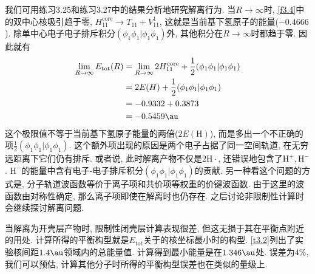我们可用练习3.25和练习3.27中的结果分析地研究解离行为. 
当$R\to\infty$时, 
\autoref{f3.4}中的双中心核吸引趋于零, 
$H_{11}^\mathrm{core}\to T_{11}+V_{11}^1$, 
这就是当前基下氢原子的能量($-0.4666$). 
除单中心电子电子排斥积分$(\phi_1\phi_1|\phi_1\phi_1)$外, 
其他积分在$R\to \infty$时都趋于零. 
因此就有
\begin{align*}
	\lim_{R\to\infty} E_\mathrm{tot}(R) & = \lim_{R\to\infty} 2H_{11}^\mathrm{core} + \frac{1}{2}(\phi_1\phi_1|\phi_1\phi_1) \\
	& = 2E(H) + \frac{1}{2}(\phi_1\phi_1|\phi_1\phi_1)                                   \\
	& = -0.9332 + 0.3873                                                                 \\
	& = -0.5459\au
\end{align*}
这个极限值不等于当前基下氢原子能量的两倍($2E(\mathrm{H})$), 
而是多出一个不正确的项$\frac{1}{2}(\phi_1\phi_1|\phi_1\phi_1)$. 
这个额外项出现的原因是两个电子占据了同一空间轨道, 
在无穷远距离下它们仍有排斥. 
或者说, 此时解离产物不仅是$2\mathrm{H}\cdot$, 
还错误地包含了$\mathrm{H}^+,\mathrm{H}^-$. 
$\mathrm{H}^-$的能量中含有电子-电子排斥积分$(\phi_1\phi_1|\phi_1\phi_1)$的贡献. 
另一种看这个问题的方式是, 
分子轨道波函数等价于离子项和共价项等权重的价键波函数. 
由于这里的波函数由对称性确定, 
那么离子项即使在解离时也仍存在. 
之后讨论非限制性\hft 计算时会继续探讨解离问题.


当解离为开壳层产物时, 
限制性闭壳层\hft 计算表现很差, 
但这无损于其在平衡点附近的用处. 
计算所得的平衡构型就是$E_\mathrm{tot}$关于的核坐标最小时的构型. 
\autoref{t3.2}列出了实验核间距$1.4\au$领域内的总能量值. 
计算得到最小能量是在$1.346\au$处. 
误差为$4\%$, 
我们可以预估, 
计算其他分子时所得的平衡构型误差也在类似的量级上. 


